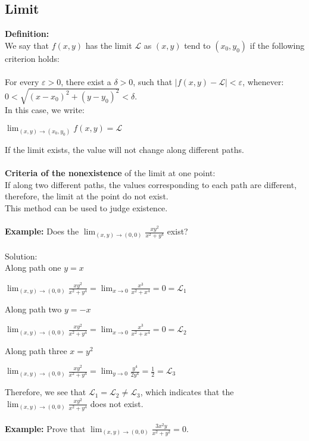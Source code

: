 \subsection{Limit}
\textbf{Definition:}\\
We say that $f(x,y)$ has the limit $\mathcal{L}$ as $(x,y)$ tend to $(x_0,y_0)$ if the following criterion holds:
\\ \\For every $\varepsilon > 0$, there exist a $\delta >0$, such that $|f(x,y)-\mathcal{L}|<\varepsilon $, whenever: $0<\sqrt{(x-x_0)^2+(y-y_0)^2}<\delta$. \\
In this case, we write:
\begin{center}
$\displaystyle\lim_{(x,y) \to (x_0,y_0)} f(x,y) = \mathcal{L}$
\end{center}
If the limit exists, the value will not change along different paths.\\ \\
\textbf{Criteria of the nonexistence} of the limit at one point:\\
If along two different paths, the values corresponding to each path are different, therefore, the limit at the point do not exist.\\
This method can be used to judge existence.\\ \\
\textbf{Example:} Does the $\displaystyle\lim_{(x,y) \to (0,0)} \frac{xy^2}{x^2+y^4}$ exist?\\ \\Solution:\\
Along path one $y=x$
\begin{center}
$\displaystyle\lim_{(x,y) \to (0,0)} \frac{xy^2}{x^2+y^4}=\displaystyle\lim_{x \to 0} \frac{x^3}{x^2+x^4}=0=\mathcal{L}_1$
\end{center}
Along path two $y=-x$
\begin{center}
$\displaystyle\lim_{(x,y) \to (0,0)} \frac{xy^2}{x^2+y^4}=\displaystyle\lim_{x \to 0} \frac{x^3}{x^2+x^4}=0=\mathcal{L}_2$
\end{center}
Along path three $x=y^2$
\begin{center}
$\displaystyle\lim_{(x,y) \to (0,0)} \frac{xy^2}{x^2+y^4}=\displaystyle\lim_{y \to 0}\frac{y^4}{2y^4}=\frac{1}{2}=\mathcal{L}_3$
\end{center}
Therefore, we see that $\mathcal{L}_1=\mathcal{L}_2 \neq \mathcal{L}_3$, which indicates that the $\lim_{(x,y) \to (0,0)} \frac{xy^2}{x^2+y^4}$ does not exist.\\ \\
\textbf{Example:}  Prove that $\displaystyle\lim_{(x,y) \to (0,0)} \frac{3x^2y }{x^2+y^2}=0$.\\ \\


